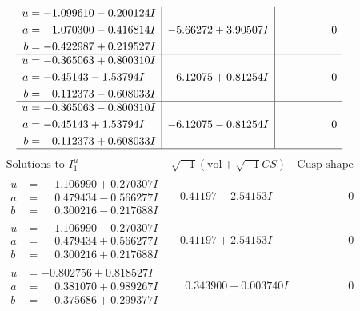 \documentclass[1p]{elsarticle_modified}
\theoremstyle{definition}
\newcommand{\I}{\sqrt{-1}}
\begin{document}
$$\begin{array}{c|c|c}
\begin{aligned}
u &= -1.099610 - 0.200124 I \\
a &= \phantom{-}1.070300 - 0.416814 I \\
b &= -0.422987 + 0.219527 I\end{aligned}
 & -5.66272 + 3.90507 I & \phantom{-0.000000 } 0 \\ \hline\begin{aligned}
u &= -0.365063 + 0.800310 I \\
a &= -0.45143 - 1.53794 I \\
b &= \phantom{-}0.112373 - 0.608033 I\end{aligned}
 & -6.12075 + 0.81254 I & \phantom{-0.000000 } 0 \\ \hline\begin{aligned}
u &= -0.365063 - 0.800310 I \\
a &= -0.45143 + 1.53794 I \\
b &= \phantom{-}0.112373 + 0.608033 I\end{aligned}
 & -6.12075 - 0.81254 I & \phantom{-0.000000 } 0\\
 \hline 
 \end{array}$$\newpage$$\begin{array}{c|c|c}  
\text{Solutions to }I^u_{1}& \I (\text{vol} + \sqrt{-1}CS) & \text{Cusp shape}\\
 \hline 
\begin{aligned}
u &= \phantom{-}1.106990 + 0.270307 I \\
a &= \phantom{-}0.479434 - 0.566277 I \\
b &= \phantom{-}0.300216 - 0.217688 I\end{aligned}
 & -0.41197 - 2.54153 I & \phantom{-0.000000 } 0 \\ \hline\begin{aligned}
u &= \phantom{-}1.106990 - 0.270307 I \\
a &= \phantom{-}0.479434 + 0.566277 I \\
b &= \phantom{-}0.300216 + 0.217688 I\end{aligned}
 & -0.41197 + 2.54153 I & \phantom{-0.000000 } 0 \\ \hline\begin{aligned}
u &= -0.802756 + 0.818527 I \\
a &= \phantom{-}0.381070 + 0.989267 I \\
b &= \phantom{-}0.375686 + 0.299377 I\end{aligned}
 & \phantom{-}0.343900 + 0.003740 I & \phantom{-0.000000 } 0 \\ \hline\begin{aligned}

\end{aligned}
\end{array}$$
\end{document}
